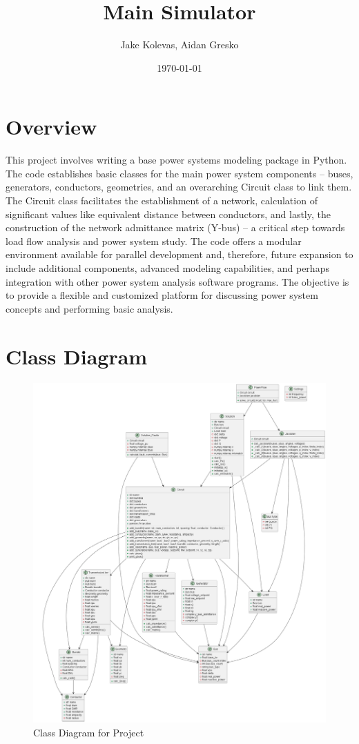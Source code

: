 \documentclass{article}
\author{Jake Kolevas, Aidan Gresko}
\title{Main Simulator}
\date{\today}
\begin{document}
	\maketitle
	
	\section{Overview}
	This project involves writing a base power systems modeling package in Python. The code establishes basic classes for the main power system components – buses, generators, conductors, geometries, and an overarching Circuit class to link them. The Circuit class facilitates the establishment of a network, calculation of significant values like equivalent distance between conductors, and lastly, the construction of the network admittance matrix (Y-bus) – a critical step towards load flow analysis and power system study. The code offers a modular environment available for parallel development and, therefore, future expansion to include additional components, advanced modeling capabilities, and perhaps integration with other power system analysis software programs. The objective is to provide a flexible and customized platform for discussing power system concepts and performing basic analysis.
	
	\section{Class Diagram}
	
	\begin{figure}[H]
		\centering
		\includegraphics[scale=0.25]{../out/circuit/circuit.png}	
		\caption{Class Diagram for Project}
	\end{figure}
	
\end{document}
